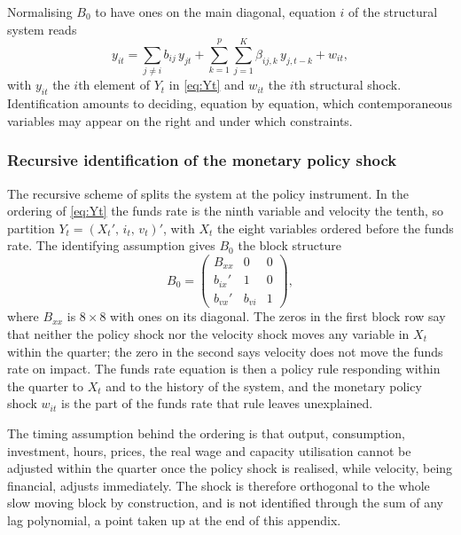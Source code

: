 \documentclass[12pt, a4paper]{article}
\begin{document}
\begin{appendices}
Normalising $B_0$ to have ones on the main diagonal, equation $i$ of the structural system reads
\begin{equation}
    y_{it} = \sum_{j \neq i} b_{ij}\, y_{jt}
           + \sum_{k=1}^{p}\sum_{j=1}^{K} \beta_{ij,k}\, y_{j,t-k} + w_{it},
    \label{eq:app_eq_i}
\end{equation}
with $y_{it}$ the $i$th element of $Y_t$ in \eqref{eq:Yt} and $w_{it}$ the $i$th structural
shock. Identification amounts to deciding, equation by equation, which contemporaneous variables
may appear on the right and under which constraints.

\subsubsection*{Recursive identification of the monetary policy shock}

The recursive scheme of \citet{CEE2005} splits the system at the policy instrument. In the
ordering of \eqref{eq:Yt} the funds rate is the ninth variable and velocity the tenth, so
partition $Y_t = (X_t',\, i_t,\, v_t)'$, with $X_t$ the eight variables ordered before the funds
rate. The identifying assumption gives $B_0$ the block structure
\begin{equation}
    B_0 =
    \begin{pmatrix}
        B_{xx} & 0 & 0 \\[2pt]
        b_{ix}' & 1 & 0 \\[2pt]
        b_{vx}' & b_{vi} & 1
    \end{pmatrix},
    \label{eq:app_block_b0}
\end{equation}
where $B_{xx}$ is $8 \times 8$ with ones on its diagonal. The zeros in the first block row say
that neither the policy shock nor the velocity shock moves any variable in $X_t$ within the
quarter; the zero in the second says velocity does not move the funds rate on impact. The funds
rate equation is then a policy rule responding within the quarter to $X_t$ and to the history of
the system, and the monetary policy shock $w_{it}$ is the part of the funds rate that rule
leaves unexplained.

The timing assumption behind the ordering is that output, consumption, investment, hours,
prices, the real wage and capacity utilisation cannot be adjusted within the quarter once the
policy shock is realised, while velocity, being financial, adjusts immediately. The shock is
therefore orthogonal to the whole slow moving block by construction, and is not identified
through the sum of any lag polynomial, a point taken up at the end of this appendix.


\end{appendices}
\end{document}
